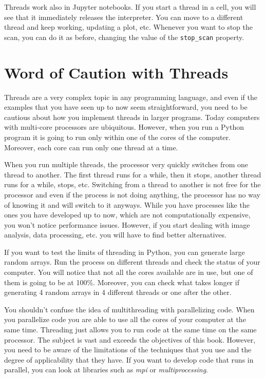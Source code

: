
Threads work also in Jupyter notebooks. If you start a thread in a cell,
you will see that it immediately releases the interpreter. You can move
to a different thread and keep working, updating a plot, etc. Whenever
you want to stop the scan, you can do it as before, changing the value
of the \texttt{stop_scan} property.


\section{Word of Caution with Threads}\label{word-of-caution-withthreads}

Threads are a very complex topic in any programming language, and even
if the examples that you have seen up to now seem straightforward, you
need to be cautious about how you implement threads in larger programs.
Today computers with multi-core processors are ubiquitous. However, when
you run a Python program it is going to run only within one of the cores
of the computer. Moreover, each core can run only one thread at a time.

When you run multiple threads, the processor very quickly switches from
one thread to another. The first thread runs for a while, then it stops,
another thread runs for a while, stops, etc. Switching from a thread to
another is not free for the processor and even if the process is not
doing anything, the processor has no way of knowing it and will switch
to it anyways. While you have processes like the ones you have developed
up to now, which are not computationally expensive, you won't notice
performance issues. However, if you start dealing with image analysis,
data processing, etc. you will have to find better alternatives.

If you want to test the limits of threading in Python, you can generate
large random arrays. Run the process on different threads and check the
status of your computer. You will notice that not all the cores
available are in use, but one of them is going to be at 100\%. Moreover,
you can check what takes longer if generating 4 random arrays in 4
different threads or one after the other.

You shouldn't confuse the idea of multithreading with parallelizing
code. When you parallelize code you are able to use all the cores of
your computer at the same time. Threading just allows you to run code at
the same time on the same processor. The subject is vast and exceeds the
objectives of this book. However, you need to be aware of the
limitations of the techniques that you use and the degree of
applicability that they have. If you want to develop code that runs in
parallel, you can look at libraries such as \emph{mpi} or
\emph{multiprocessing}.


